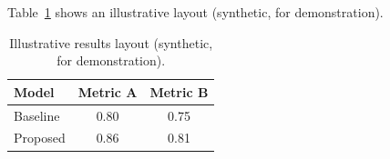 Table~\ref{tab:fixture} shows an illustrative layout (synthetic, for demonstration).

\begin{table}[ht]
\centering
\caption{Illustrative results layout (synthetic, for demonstration).}
\label{tab:fixture}
\begin{tabular}{lcc}
\toprule
Model & Metric A & Metric B \\
\midrule
Baseline & 0.80 & 0.75 \\
Proposed & 0.86 & 0.81 \\
\bottomrule
\end{tabular}
\end{table}
